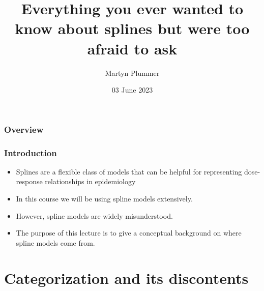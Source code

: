\documentclass[aspectratio=169]{beamer}
\title{Everything you ever wanted to know about splines but were too afraid to ask}
\author{Martyn Plummer}
\institute[Warwick] %
{
  University of Warwick
}
\date[Tartu]{03 June 2023}
\begin{document}
\begin{frame}[plain]
  \titlepage
\end{frame}

\begin{frame}
  \frametitle{Overview}
  \tableofcontents
\end{frame}

\begin{frame}
  \frametitle{Introduction}

  \begin{itemize}
  \item Splines are a flexible class of models that can be helpful for
    representing dose-response relationships in epidemiology
  \item In this course we will be using spline models extensively.
  \item However, spline models are widely misunderstood.
  \item The purpose of this lecture is to give a conceptual background
    on where spline models come from.
  \end{itemize}
  
\end{frame}

\section{Categorization and its discontents}
\end{document}
